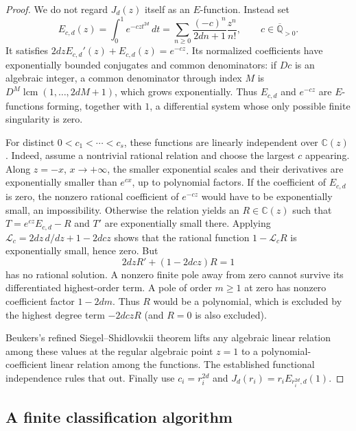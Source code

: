\documentclass[11pt,a4paper]{article}
\theoremstyle{definition}
\theoremstyle{remark}
\numberwithin{equation}{section}
\begin{document}
\begin{proof}
We do not regard $J_d(z)$ itself as an $E$-function. Instead set
\[
E_{c,d}(z)=\int_0^1e^{-czt^{2d}}\,dt
=\sum_{n\ge0}\frac{(-c)^n}{2dn+1}\frac{z^n}{n!},
\qquad c\in\overline{\mathbb Q}_{>0}.
\]
It satisfies $2dzE_{c,d}'(z)+E_{c,d}(z)=e^{-cz}$. Its normalized
coefficients have exponentially bounded conjugates and common
denominators: if $Dc$ is an algebraic integer, a common denominator
through index $M$ is
$D^M\operatorname{lcm}(1,\ldots,2dM+1)$, which grows exponentially.
Thus $E_{c,d}$ and $e^{-cz}$ are $E$-functions forming, together with
$1$, a differential system whose only possible finite singularity
is zero.

For distinct $0<c_1<\cdots<c_s$, these functions are linearly
independent over $\mathbb C(z)$. Indeed, assume a nontrivial rational
relation and choose the largest $c$ appearing. Along $z=-x$,
$x\to+\infty$, the smaller exponential scales and their derivatives
are exponentially smaller than $e^{cx}$, up to polynomial factors.
If the coefficient of $E_{c,d}$ is zero, the nonzero rational
coefficient of $e^{-cz}$ would have to be exponentially small, an
impossibility. Otherwise the relation yields an $R\in\mathbb C(z)$
such that $T=e^{cz}E_{c,d}-R$ and $T'$ are exponentially small there.
Applying $\mathcal L_c=2dz\,d/dz+1-2dcz$ shows that the rational
function $1-\mathcal L_cR$ is exponentially small, hence zero.
But
\[
2dzR'+(1-2dcz)R=1
\]
has no rational solution. A nonzero finite pole away from zero
cannot survive its differentiated highest-order term. A pole of
order $m\ge1$ at zero has nonzero coefficient factor $1-2dm$.
Thus $R$ would be a polynomial, which is excluded by the highest
degree term $-2dczR$ (and $R=0$ is also excluded).

Beukers's refined Siegel--Shidlovskii theorem
\cite[Theorem~1.3]{beta-stats-beukers} lifts any algebraic linear
relation among these values at the regular algebraic point $z=1$
to a polynomial-coefficient linear relation among the functions.
The established functional independence rules that out. Finally use
$c_i=r_i^{2d}$ and $J_d(r_i)=r_iE_{r_i^{2d},d}(1)$.
\end{proof}

\subsection{A finite classification algorithm}
\end{document}

